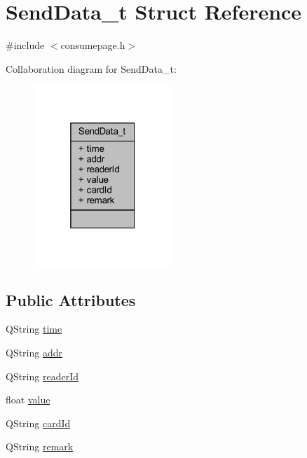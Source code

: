 \hypertarget{struct_send_data__t}{}\section{Send\+Data\+\_\+t Struct Reference}
\label{struct_send_data__t}


{\ttfamily \#include $<$consumepage.\+h$>$}



Collaboration diagram for Send\+Data\+\_\+t\+:
\nopagebreak
\begin{figure}[H]
\begin{center}
\leavevmode
\includegraphics[width=148pt]{struct_send_data__t__coll__graph}
\end{center}
\end{figure}
\subsection*{Public Attributes}
\begin{DoxyCompactItemize}
\item 
Q\+String \mbox{\hyperlink{struct_send_data__t_a14f7c5d361050c31f7e72589fcc0b70b}{time}}
\item 
Q\+String \mbox{\hyperlink{struct_send_data__t_a9ec37fd5ff51697edb06f08e24903893}{addr}}
\item 
Q\+String \mbox{\hyperlink{struct_send_data__t_a4032f66deeb82babe30b4f5e31a6dc68}{reader\+Id}}
\item 
float \mbox{\hyperlink{struct_send_data__t_a12f4d4700f5232b86c41e73082ded5ed}{value}}
\item 
Q\+String \mbox{\hyperlink{struct_send_data__t_a40f49a35596ee7263d4ef356238e7e1b}{card\+Id}}
\item 
Q\+String \mbox{\hyperlink{struct_send_data__t_ab02a56bb0758fce6e29554392ab43564}{remark}}
\end{DoxyCompactItemize}



